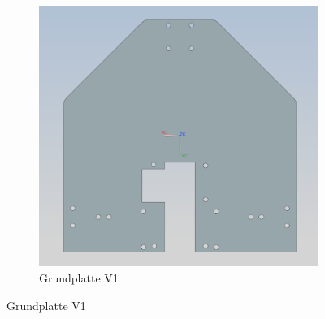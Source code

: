 \begin{figure}[H]
\begin{subfigure}[b]{0.45\textwidth}
        \includegraphics[width=\linewidth]{assets/MT/Grundplatte_V1.png}
        \caption{Grundplatte V1}
    \end{subfigure}

    \vspace{0.5cm}


\end{figure}
